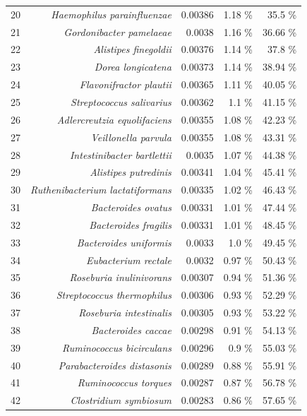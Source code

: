 \documentclass{article}
\begin{document}
\begin{table}[h]
\begin{centering}
\begin{tabular}{|r|r|r|r|r|}
      20 & \textit{Haemophilus parainfluenzae} & 0.00386 & 1.18 \% & 35.5 \% \\
      21 & \textit{Gordonibacter pamelaeae} & 0.0038 & 1.16 \% & 36.66 \% \\
      22 & \textit{Alistipes finegoldii} & 0.00376 & 1.14 \% & 37.8 \% \\
      23 & \textit{Dorea longicatena} & 0.00373 & 1.14 \% & 38.94 \% \\
      24 & \textit{Flavonifractor plautii} & 0.00365 & 1.11 \% & 40.05 \% \\
      25 & \textit{Streptococcus salivarius} & 0.00362 & 1.1 \% & 41.15 \% \\
      26 & \textit{Adlercreutzia equolifaciens} & 0.00355 & 1.08 \% & 42.23 \% \\
      27 & \textit{Veillonella parvula} & 0.00355 & 1.08 \% & 43.31 \% \\
      28 & \textit{Intestinibacter bartlettii} & 0.0035 & 1.07 \% & 44.38 \% \\
      29 & \textit{Alistipes putredinis} & 0.00341 & 1.04 \% & 45.41 \% \\
      30 & \textit{Ruthenibacterium lactatiformans} & 0.00335 & 1.02 \% & 46.43 \% \\
      31 & \textit{Bacteroides ovatus} & 0.00331 & 1.01 \% & 47.44 \% \\
      32 & \textit{Bacteroides fragilis} & 0.00331 & 1.01 \% & 48.45 \% \\
      33 & \textit{Bacteroides uniformis} & 0.0033 & 1.0 \% & 49.45 \% \\
      34 & \textit{Eubacterium rectale} & 0.0032 & 0.97 \% & 50.43 \% \\
      35 & \textit{Roseburia inulinivorans} & 0.00307 & 0.94 \% & 51.36 \% \\
      36 & \textit{Streptococcus thermophilus} & 0.00306 & 0.93 \% & 52.29 \% \\
      37 & \textit{Roseburia intestinalis} & 0.00305 & 0.93 \% & 53.22 \% \\
      38 & \textit{Bacteroides caccae} & 0.00298 & 0.91 \% & 54.13 \% \\
      39 & \textit{Ruminococcus bicirculans} & 0.00296 & 0.9 \% & 55.03 \% \\
      40 & \textit{Parabacteroides distasonis} & 0.00289 & 0.88 \% & 55.91 \% \\
      41 & \textit{Ruminococcus torques} & 0.00287 & 0.87 \% & 56.78 \% \\
      42 & \textit{Clostridium symbiosum} & 0.00283 & 0.86 \% & 57.65 \% \\

\end{tabular}
\end{centering}
\end{table}
\end{document}
